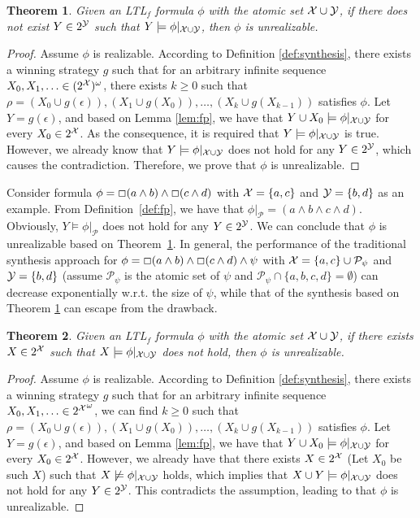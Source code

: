 \documentclass[letterpaper]{article} %
\newcommand{\ltlf}{\textsf{LTL}$_f$\xspace}
\newtheorem{theorem}{Theorem}
\begin{document}
\begin{theorem}\label{thm:failure-1}
Given an \ltlf formula $\phi$ with the atomic set $\mathcal{X}\cup \mathcal{Y}$, if there does not exist $Y\in 2^{\mathcal{Y}}$ such that $Y\models \phi|_{\mathcal{X}\cup\mathcal{Y}}$, then $\phi$ is unrealizable. 
\end{theorem}
\begin{proof}
Assume $\phi$ is realizable. According to Definition \ref{def:synthesis}, there exists a winning strategy $g$ such that for an arbitrary infinite sequence $X_0,X_1,\ldots\in (2^{\mathcal{X}})^{\omega}$, there exists $k\geq 0$ such that $\rho=(X_0\cup g(\epsilon)),(X_1\cup g(X_0)), \ldots, (X_k\cup g(X_{k-1}))$ satisfies $\phi$. Let $Y = g(\epsilon)$, and based on Lemma \ref{lem:fp}, we have that $Y\cup X_0\models \phi|_{\mathcal{X}\cup\mathcal{Y}}$ for every $X_0\in 2^{\mathcal{X}}$. As the consequence, it is required that $Y\models \phi|_{\mathcal{X}\cup\mathcal{Y}}$ is true. However, we already know that $Y\models \phi|_{\mathcal{X}\cup\mathcal{Y}}$ does not hold for any $Y\in 2^{\mathcal{Y}}$, which causes the contradiction. Therefore, we prove that $\phi$ is unrealizable.
\end{proof}

Consider formula $\phi= \Box (a\wedge b)\wedge \Box (c\wedge d)$ with $\mathcal{X}=\{a,c\}$ and $\mathcal{Y}=\{b,d\}$ as an example. From Definition~\ref{def:fp}, we have that $\phi|_\mathcal{P}=(a\wedge b\wedge c\wedge d)$. Obviously, $Y\models \phi|_\mathcal{P}$ does not hold for any $Y\in 2^{\mathcal{Y}}$. We can conclude that $\phi$ is unrealizable based on Theorem~\ref{thm:failure-1}. In general, the performance of the traditional synthesis approach for $\phi= \Box (a\wedge b)\wedge \Box (c\wedge d) \wedge\psi$ with $\mathcal{X}=\{a,c\}\cup \mathcal{P}_{\psi}$ and $\mathcal{Y}=\{b,d\}$ (assume $\mathcal{P}_{\psi}$ is the atomic set of $\psi$ and $\mathcal{P}_{\psi} \cap \{a,b,c,d\} = \emptyset$) can decrease exponentially w.r.t. the size of $\psi$, while that of the synthesis based on Theorem \ref{thm:failure-1} can escape from the drawback. 

\iffalse
\begin{theorem}\label{thm:failure-2}
	Given an \ltlf formula $\phi$ with the atomic set $\mathcal{X}\cup \mathcal{Y}$, if there exists $X\in 2^{\mathcal{X}}$ such that $X\models \phi|_{\mathcal{X}\cup\mathcal{Y}}$ does not hold, then $\phi$ is unrealizable. 
\end{theorem}
\begin{proof}
Assume $\phi$ is realizable. According to Definition \ref{def:synthesis}, there exists a winning strategy $g$ such that for an arbitrary infinite sequence $X_0,X_1,\ldots\in {2^{\mathcal{X}}}^{\omega}$, we can find $k\geq 0$ such that $\rho=(X_0\cup g(\epsilon)),(X_1\cup g(X_0)), \ldots, (X_k\cup g(X_{k-1}))$ satisfies $\phi$. Let $Y = g(\epsilon)$, and based on Lemma \ref{lem:fp}, we have that $Y\cup X_0\models \phi|_{\mathcal{X}\cup\mathcal{Y}}$ for every $X_0\in 2^{\mathcal{X}}$. However, we already have that there exists $X\in 2^{\mathcal{X}}$ (Let $X_0$ be such $X$) such that $X\not\models \phi|_{\mathcal{X}\cup\mathcal{Y}}$ holds, which implies that $X\cup Y\models \phi|_{\mathcal{X}\cup\mathcal{Y}}$ does not hold for any $Y\in 2^{\mathcal{Y}}$. This contradicts the assumption, leading to that $\phi$ is unrealizable.
\end{proof}
\end{document}
